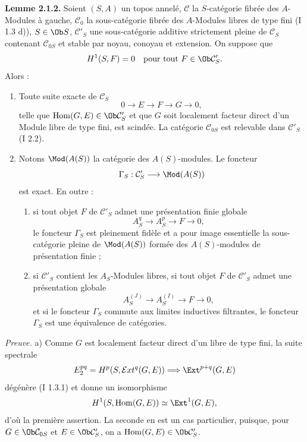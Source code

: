 \documentclass[11pt]{article}
\begin{document}
\textbf{Lemme 2.1.2.} Soient $(S,A)$ un topos annelé, $\mathcal C$ la $S$-catégorie fibrée des $A$-Modules à gauche, $\mathcal C_0$ la sous-catégorie fibrée des $A$-Modules libres de type fini (I 1.3 d)), $S\in\Ob S$, $\mathcal C'_S$ une sous-catégorie additive strictement pleine de $\mathcal C_S$ contenant $\mathcal C_{0S}$ et stable par noyau, conoyau et extension. On suppose que
\[
H^1(S,F)=0\quad\text{pour tout }F\in\Ob\mathcal C'_S.
\]
Alors :
\begin{enumerate}[label=\alph*)]
\item Toute suite exacte de $\mathcal C_S$
\[
0\longrightarrow E\longrightarrow F\longrightarrow G\longrightarrow0,
\]
telle que $\operatorname{Hom}(G,E)
\in\Ob\mathcal C'_S$ et que $G$ soit localement facteur direct d'un Module libre de type fini, est scindée. La catégorie $\mathcal C_{0S}$ est relevable dans $\mathcal C'_S$ (I 2.2).
\item Notons $\Mod(A(S))$ la catégorie des $A(S)$-modules. Le foncteur
\[
\Gamma_S:\mathcal C'_S\longrightarrow\Mod(A(S))
\]
est exact. En outre :
\begin{enumerate}[label=(\roman*)]
\item si tout objet $F$ de $\mathcal C'_S$ admet une présentation finie globale
\[
A_S^q\longrightarrow A_S^p\longrightarrow F\longrightarrow0,
\]
le foncteur $\Gamma_S$ est pleinement fidèle et a pour image essentielle la sous-catégorie pleine de $\Mod(A(S))$ formée des $A(S)$-modules de présentation finie ;
\item si $\mathcal C'_S$ contient les $A_S$-Modules libres, si tout objet $F$ de $\mathcal C'_S$ admet une présentation globale
\[
A_S^{(J)}\longrightarrow A_S^{(I)}\longrightarrow F\longrightarrow0,
\]
et si le foncteur $\Gamma_S$ commute aux limites inductives filtrantes, le foncteur $\Gamma_S$ est une équivalence de catégories.
\end{enumerate}
\end{enumerate}

\emph{Preuve.} a) Comme $G$ est localement facteur direct d'un libre de type fini, la suite spectrale
\[
E_2^{pq}=H^p(S,\mathcal{E}xt^q(G,E))\Longrightarrow\Ext^{p+q}(G,E)
\]
dégénère (I 1.3.1) et donne un isomorphisme
\[
H^1(S,\operatorname{Hom}(G,E))\simeq\Ext^1(G,E),
\]
d'où la première assertion. La seconde en est un cas particulier, puisque, pour $G\in\Ob\mathcal C_{0S}$ et $E\in\Ob\mathcal C'_S$, on a $\operatorname{Hom}(G,E)\in\Ob\mathcal C'_S$.
\end{document}
